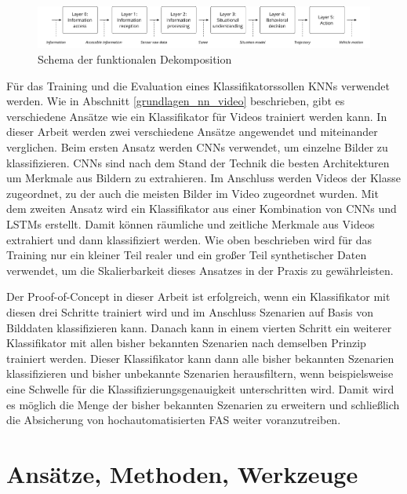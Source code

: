 \begin{figure}[h]
\centering
\includegraphics[scale=0.45]{images/funktionale_dekomposition.pdf}
\caption[Schema der funktionalen Dekomposition]{Schema der funktionalen Dekomposition \cite{amersbach2017functional}}
\label{fig_functional_decomposition}
\end{figure}

Für das Training und die Evaluation eines Klassifikatorssollen \acp{KNN} verwendet werden. Wie in Abschnitt \ref{grundlagen_nn_video} beschrieben, gibt es verschiedene Ansätze wie ein Klassifikator für Videos trainiert werden kann. In dieser Arbeit werden zwei verschiedene Ansätze angewendet und miteinander verglichen. Beim ersten Ansatz werden \acp{CNN} verwendet, um einzelne Bilder zu klassifizieren. \acp{CNN} sind nach dem Stand der Technik die besten Architekturen um Merkmale aus Bildern zu extrahieren. Im Anschluss werden Videos der Klasse zugeordnet, zu der auch die meisten Bilder im Video zugeordnet wurden. Mit dem zweiten Ansatz wird ein Klassifikator aus einer Kombination von \acp{CNN} und \acp{LSTM} erstellt. Damit können räumliche und zeitliche Merkmale aus Videos extrahiert und  dann klassifiziert werden. Wie oben beschrieben wird für das Training nur ein kleiner Teil realer und ein großer Teil synthetischer Daten verwendet, um die Skalierbarkeit dieses Ansatzes in der Praxis zu gewährleisten.

Der Proof-of-Concept in dieser Arbeit ist erfolgreich, wenn ein Klassifikator mit diesen drei Schritte trainiert wird und im Anschluss Szenarien auf Basis von Bilddaten klassifizieren kann. Danach kann in einem vierten Schritt ein weiterer Klassifikator mit allen bisher bekannten Szenarien nach demselben Prinzip trainiert werden. Dieser Klassifikator kann dann alle bisher bekannten Szenarien klassifizieren und bisher unbekannte Szenarien herausfiltern, wenn beispielsweise eine Schwelle für die Klassifizierungsgenauigkeit unterschritten wird. Damit wird es möglich die Menge der bisher bekannten Szenarien zu erweitern und schließlich die Absicherung von hochautomatisierten \ac{FAS} weiter voranzutreiben.

\section{Ansätze, Methoden, Werkzeuge}
\label{konzept_methodik}

